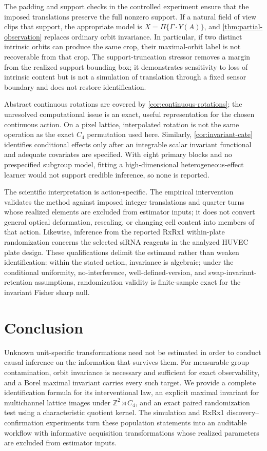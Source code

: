 \documentclass[11pt]{article}
\theoremstyle{definition}
\theoremstyle{remark}
\newcommand{\bZ}{\mathbb Z}
\newcommand{\1}{\mathbf 1}
\begin{document}
The padding and support checks in the controlled experiment ensure that the
imposed translations preserve the full nonzero support.  If a natural field of
view clips that support, the appropriate model is
\(X=\Pi\{\Gamma\cdot Y(A)\}\), and \cref{thm:partial-observation} replaces
ordinary orbit invariance.  In particular, if two distinct intrinsic orbits
can produce the same crop, their maximal-orbit label is not recoverable from
that crop.  The support-truncation stressor removes a margin from the realized
support bounding box; it demonstrates sensitivity to loss of intrinsic content
but is not a simulation of translation through a fixed sensor boundary and
does not restore identification.

Abstract continuous rotations are covered by \cref{cor:continuous-rotations};
the unresolved computational issue is an exact, useful representation for the
chosen continuous action.  On a pixel lattice, interpolated rotation is not the
same operation as the exact \(C_4\) permutation used here.  Similarly,
\cref{cor:invariant-cate} identifies conditional effects only after an
integrable scalar invariant functional and adequate covariates are specified.
With eight primary blocks and no prespecified subgroup model, fitting a
high-dimensional heterogeneous-effect learner would not support credible
inference, so none is reported.

The scientific interpretation is action-specific.  The empirical intervention
validates the method against imposed integer translations and quarter turns
whose realized elements are excluded from estimator inputs;
it does not convert general optical deformation, rescaling, or changing cell
content into members of that action.  Likewise, inference from the reported
RxRx1 within-plate randomization concerns the selected siRNA reagents in the
analyzed HUVEC plate design.
These qualifications delimit the estimand rather than weaken identification:
within the stated action, invariance is algebraic; under the conditional
uniformity, no-interference, well-defined-version, and swap-invariant-retention
assumptions, randomization validity is finite-sample exact for the invariant
Fisher sharp null.

\section{Conclusion}

Unknown unit-specific transformations need not be estimated in order to conduct
causal inference on the information that survives them.  For measurable group
contamination, orbit invariance is necessary and sufficient for exact
observability, and a Borel maximal invariant carries every such target.  We
provide a complete identification formula for its interventional law, an
explicit maximal invariant for multichannel lattice images under
\(\bZ^2\rtimes C_4\), and an exact paired randomization test using a
characteristic quotient kernel.  The simulation and RxRx1
discovery--confirmation experiments turn these population statements into an
auditable workflow with informative acquisition transformations whose realized
parameters are excluded from estimator inputs.
\end{document}
